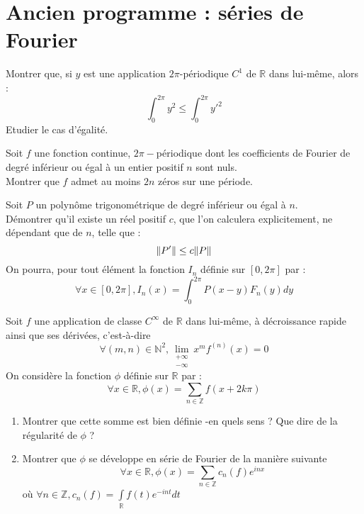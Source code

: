 \section{Ancien programme : s\'eries de Fourier}

\begin{exer}
Montrer que, si $y$ est une application $2 \pi$-périodique $C^1$ de $\mathbb{R}$ dans lui-même, alors :
\[\int_{0}^{2 \pi} y^2 \leq \int_{0}^{2 \pi} y'^2\]
Etudier le cas d'égalité.
\end{exer}

\begin{exer}
Soit $f$ une fonction continue, $2\pi-$périodique dont les coefficients de Fourier %
de degré inférieur ou égal à un entier positif $n$ sont nuls.\\
Montrer que $f$ admet au moins $2n$ zéros sur une période.
\end{exer}

\begin{exer}
Soit $P$ un polynôme trigonométrique de degré inférieur ou égal à $n$.\\
Démontrer qu'il existe un réel positif $c$, que l'on calculera explicitement, ne dépendant que de $n$, telle que :
\[\Arrowvert P' \Arrowvert \leq c \Arrowvert P \Arrowvert\]
On pourra, pour tout élément la fonction $I_n$ définie sur $[0,2\pi]$ par :
\[\forall x \in [0,2\pi], I_n(x) = \int_0^{2\pi} P(x-y)F_n(y) dy\]
\end{exer}

\begin{exer}
Soit $f$ une application de classe $C^{\infty}$ de $\mathbb{R}$ dans lui-même, à décroissance rapide ainsi que ses dérivées, c'est-à-dire 
\[\forall (m,n) \in \mathbb{N}^2 , \lim\limits_{\substack{+ \infty \\ - \infty}} x^m f^{(n)}(x) = 0\]
On considère la fonction $\phi$ définie sur $\mathbb{R}$ par :\[\forall x \in \mathbb{R} , \phi (x) = \sum\limits_{n \in \mathbb{Z}} f(x+2k\pi)\]
\begin{enumerate}
\item Montrer que cette somme est bien définie -en quels sens ? Que dire de la régularité de $\phi$ ?
\item Montrer que $\phi$ se développe en série de Fourier de la manière suivante
\[\forall x \in \mathbb{R} , \phi (x) = \sum\limits_{n \in \mathbb{Z}} c_n(f) e^{inx}\]
où $\forall n \in \mathbb{Z} , c_n(f) = \int\limits_{\mathbb{R}} f(t) e^{-int} dt$
\end{enumerate}
\end{exer}

